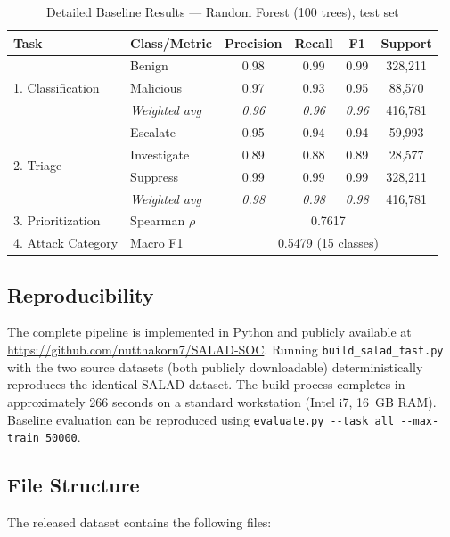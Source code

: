 \documentclass[review]{elsarticle}
\begin{document}
\begin{table}[h]
\centering
\caption{Detailed Baseline Results --- Random Forest (100 trees), test set}
\label{tab:results}
\begin{tabular}{llcccc}
\toprule
\textbf{Task} & \textbf{Class/Metric} & \textbf{Precision} & \textbf{Recall} & \textbf{F1} & \textbf{Support} \\
\midrule
\multirow{3}{*}{1. Classification} & Benign & 0.98 & 0.99 & 0.99 & 328,211 \\
 & Malicious & 0.97 & 0.93 & 0.95 & 88,570 \\
 & \textit{Weighted avg} & \textit{0.96} & \textit{0.96} & \textit{0.96} & 416,781 \\
\midrule
\multirow{4}{*}{2. Triage} & Escalate & 0.95 & 0.94 & 0.94 & 59,993 \\
 & Investigate & 0.89 & 0.88 & 0.89 & 28,577 \\
 & Suppress & 0.99 & 0.99 & 0.99 & 328,211 \\
 & \textit{Weighted avg} & \textit{0.98} & \textit{0.98} & \textit{0.98} & 416,781 \\
\midrule
3. Prioritization & Spearman $\rho$ & \multicolumn{4}{c}{0.7617} \\
\midrule
4. Attack Category & Macro F1 & \multicolumn{4}{c}{0.5479 (15 classes)} \\
\bottomrule
\end{tabular}
\end{table}


\subsection{Reproducibility}

The complete pipeline is implemented in Python and publicly available at \url{https://github.com/nutthakorn7/SALAD-SOC}. Running \texttt{build\_salad\_fast.py} with the two source datasets (both publicly downloadable) deterministically reproduces the identical SALAD dataset. The build process completes in approximately 266 seconds on a standard workstation (Intel i7, 16~GB RAM). Baseline evaluation can be reproduced using \texttt{evaluate.py -{}-task all -{}-max-train 50000}.

\subsection{File Structure}

The released dataset contains the following files:
\end{document}
